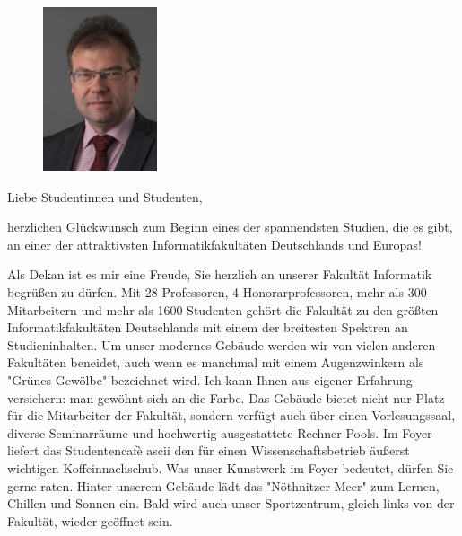 
\begin{figure}
  \vspace{-15pt}
  \begin{centering}
    \includegraphics[width=0.3\textwidth]{img/uweassmann.png}
  \end{centering}
  \vspace{-20pt}
\end{figure}

Liebe Studentinnen und Studenten,

herzlichen Glückwunsch zum Beginn eines der spannendsten Studien, die es gibt, an einer der attraktivsten Informatikfakultäten Deutschlands und Europas!

Als Dekan ist es mir eine Freude, Sie herzlich an unserer Fakultät Informatik begrüßen zu dürfen. Mit 28 Professoren, 4 Honorarprofessoren, mehr als 300 Mitarbeitern und mehr als 1600 Studenten gehört die Fakultät zu den größten Informatikfakultäten Deutschlands mit einem der breitesten Spektren an Studieninhalten. Um unser modernes Gebäude werden wir von vielen anderen Fakultäten beneidet, auch wenn es manchmal mit einem Augenzwinkern als "Grünes Gewölbe" bezeichnet wird. Ich kann Ihnen aus eigener Erfahrung versichern: man gewöhnt sich an die Farbe. Das Gebäude bietet nicht nur Platz für die Mitarbeiter der Fakultät, sondern verfügt auch über einen Vorlesungssaal, diverse Seminarräume und hochwertig ausgestattete Rechner-Pools. Im Foyer liefert das Studentencafè ascii den für einen Wissenschaftsbetrieb äußerst wichtigen Koffeinnachschub. Was unser Kunstwerk im Foyer bedeutet, dürfen Sie gerne raten. Hinter unserem Gebäude lädt das "Nöthnitzer Meer" zum Lernen, Chillen und Sonnen ein. Bald wird auch unser Sportzentrum, gleich links von der Fakultät, wieder geöffnet sein.

